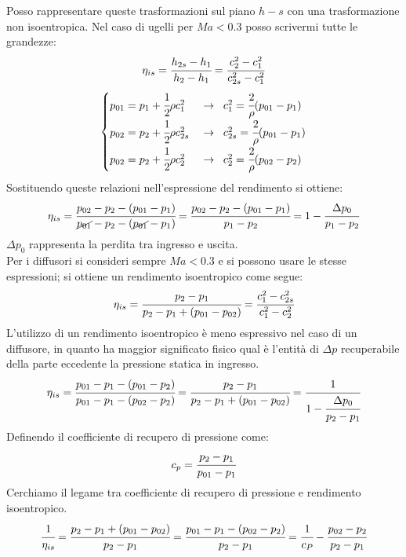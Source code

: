 Posso rappresentare queste trasformazioni sul piano $h-s$ con una trasformazione non isoentropica. Nel caso di ugelli per $Ma < 0.3$ posso scrivermi tutte le grandezze: 
\begin{align*}
\eta_{is} = \cfrac{h_{2s} - h_1}{h_2-h_1} = \cfrac{c_2^2 - c_1^2}{c_{2s}^2 - c_1^2}
\end{align*}
\begin{align*}
\begin{cases}
p_{01} = p_1 + \cfrac{1}{2} \rho c_1^2 \;& \to  \;\; c_1^2 = \cfrac{2}{\rho} (p_{01} - p_1)\\
p_{02} = p_2 + \cfrac{1}{2} \rho c_{2s}^2 \;& \to  \;\; c_{2s}^2 = \cfrac{2}{\rho} (p_{01} - p_1)\\
p_{02} = p_2 + \cfrac{1}{2} \rho c_2^2 \;& \to  \;\; c_2^2 = \cfrac{2}{\rho} (p_{02} - p_2)
\end{cases}
\end{align*}
Sostituendo queste relazioni nell'espressione del rendimento si ottiene:
\begin{align*}
\eta_{is} = \cfrac{p_{02} - p_2 - (p_{01} - p_1)}{\cancel{p_{01}} - p_2 - (\cancel{p_{01}} - p_1)}=\cfrac{p_{02} - p_2 -(p_{01} - p_1)}{p_1-p_2}=1- \cfrac{\Delta p_0}{p_1 - p_2}
\end{align*}
$\Delta p_0$ rappresenta la perdita tra ingresso e uscita.\\
Per i diffusori si consideri sempre $Ma<0.3$ e si possono usare le stesse espressioni; si ottiene un rendimento isoentropico come segue:
\begin{align*}
\eta_{is} = \cfrac{p_2 - p_1}{p_2-p_1 + (p_{01}-p_{02})} = \cfrac{c_1^2 - c_{2s}^2}{c_1^2 - c_2^2}
\end{align*}
L'utilizzo di un rendimento isoentropico è meno espressivo nel caso di un diffusore, in quanto ha maggior significato fisico qual è l'entità di $ \Delta p$ recuperabile della parte eccedente la pressione statica in ingresso.
\begin{align*}
\eta_{is} = \cfrac{p_{01} - p_1 - (p_{01} - p_2)}{p_{01} - p_1-(p_{02} - p_2)} = \cfrac{p_2 - p_1}{p_2 - p_1 + (p_{01} - p_{02})} = \cfrac{1}{1- \cfrac{\Delta p_0}{p_2 - p_1}}
\end{align*}
Definendo il coefficiente di recupero di pressione come:
\begin{align*}
c_p = \cfrac{p_2 - p_1}{p_{01} - p_1}
\end{align*}
Cerchiamo il legame tra coefficiente di recupero di pressione e rendimento isoentropico.
\begin{align*}
\cfrac{1}{\eta_{is}} = \cfrac{p_2 - p_1 + (p_{01} - p_{02})}{p_2 - p_1} = \cfrac{p_{01} - p_1 - (p_{02} - p_2)}{p_2-p_1} = \cfrac{1}{c_P} - \cfrac{p_{02} - p_2}{p_2 - p_1}
\end{align*}
